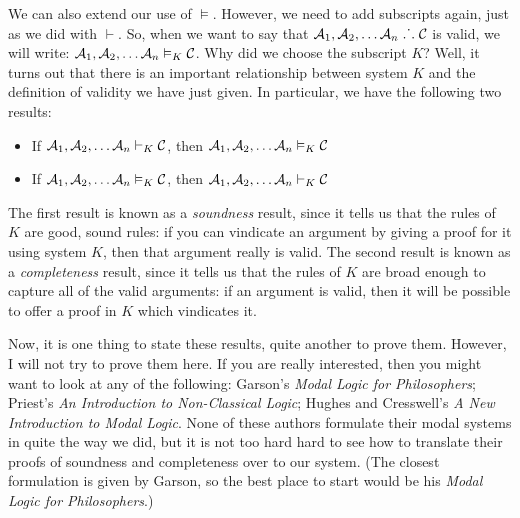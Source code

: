 We can also extend our use of $\vDash$. However, we need to add subscripts again, just as we did with $\vdash$. So, when we want to say that $\mathcal{A}_1,\mathcal{A}_2, \dots \mathcal{A}_n\mathrel{\ldotp\dot{}\,\ldotp}\mathcal{C}$ is valid, we will write: $\mathcal{A}_1,\mathcal{A}_2, \dots \mathcal{A}_n\vDash_K\mathcal{C}$. Why did we choose the subscript $K$? Well, it turns out that there is an important relationship between system $K$ and the definition of validity we have just given. In particular, we have the following two results:
\begin{itemize}
\item If $\mathcal{A}_1,\mathcal{A}_2, \dots \mathcal{A}_n\vdash_K\mathcal{C}$, then $\mathcal{A}_1,\mathcal{A}_2, \dots \mathcal{A}_n\vDash_K\mathcal{C}$
\item If $\mathcal{A}_1,\mathcal{A}_2, \dots \mathcal{A}_n\vDash_K\mathcal{C}$, then $\mathcal{A}_1,\mathcal{A}_2, \dots \mathcal{A}_n\vdash_K\mathcal{C}$
\end{itemize}
The first result is known as a \emph{soundness} result, since it tells us that the rules of $K$ are good, sound rules: if you can vindicate an argument by giving a proof for it using system $K$, then that argument really is valid. The second result is known as a \emph{completeness} result, since it tells us that the rules of $K$ are broad enough to capture all of the valid arguments: if an argument is valid, then it will be possible to offer a proof in $K$ which vindicates it.

Now, it is one thing to state these results, quite another to prove them. However, I will not try to prove them here. If you are really interested, then you might want to look at any of the following: Garson's \emph{Modal Logic for Philosophers}; Priest's \emph{An Introduction to Non-Classical Logic}; Hughes and Cresswell's \emph{A New Introduction to Modal Logic}. None of these authors formulate their modal systems in quite the way we did, but it is not too hard hard to see how to translate their proofs of soundness and completeness over to our system. (The closest formulation is given by Garson, so the best place to start would be his \emph{Modal Logic for Philosophers}.)

